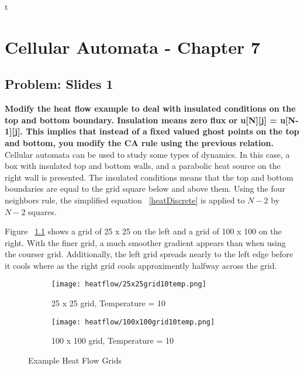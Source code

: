 t%

\chapter{Cellular Automata - Chapter 7}

\section{Problem: Slides 1}
\textbf{ Modify the heat flow example to deal with insulated conditions on the top and bottom boundary. Insulation means zero flux or u[N][j] = u[N-1][j]. This implies that instead of a fixed valued ghost points on the top and bottom, you modify the CA rule using the previous relation. }\\
\newline
Cellular automata can be used to study some types of dynamics. In this case, a box with insulated top and bottom walls, and a parabolic heat source on the right wall is presented. The insulated conditions means that the top and bottom boundaries are equal to the grid square below and above them. Using the four neighbors rule, the simplified equation ~\ref{heatDiscrete} is applied to $N-2$ by $N-2$ squares.

Figure ~\ref{heatFlow} shows a grid of 25 x 25 on the left and a grid of 100 x 100 on the right. With the finer grid, a much smoother gradient appears than when using the courser grid. Additionally, the left grid spreads nearly to the left edge before it cools where as the right grid cools approximently halfway across the grid. 

\begin{figure}[tbh]
\begin{center}
	\begin{subfigure}[tbh]{0.47\textwidth}
	\begin{center}
	\texttt{[image: heatflow/25x25grid10temp.png]}
	\caption{ 25 x 25 grid, Temperature = 10 }
	\end{center}
	\end{subfigure}
\hfill
	\begin{subfigure}[tbh]{0.47\textwidth}
	\begin{center}
	\texttt{[image: heatflow/100x100grid10temp.png]}
	\caption{ 100 x 100 grid, Temperature = 10 }
	\end{center}
	\end{subfigure}
\hfill
\caption{ Example Heat Flow Grids } \label{heatFlow}
\end{center}
\end{figure}

